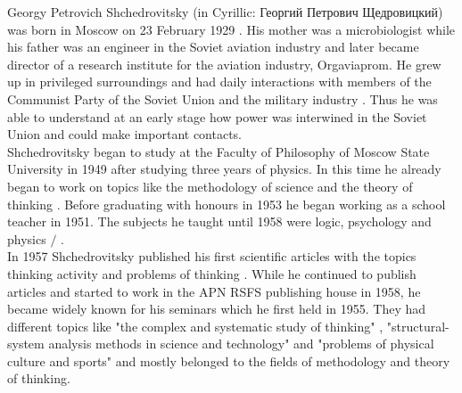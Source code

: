 \documentclass[11pt,a4paper]{article}
\begin{document}
Georgy Petrovich Shchedrovitsky (in Cyrillic: \foreignlanguage{russian}{Георгий Петрович Щедровицкий}) was born in Moscow on 23 February 1929 \cite[p. 1]{Davydova}. His mother was a microbiologist while his father was an engineer in the Soviet aviation industry and later became director of a research institute for the aviation industry, Orgaviaprom. He grew up in privileged surroundings and had daily interactions with members of the Communist Party of the Soviet Union and the military industry \cite[p. 7]{Rindzeviit2015}. Thus he was able to understand at an early stage how power was interwined in the Soviet Union and could make important contacts. \\
Shchedrovitsky began to study at the Faculty of Philosophy of Moscow State University in 1949 after studying three years of physics. In this time he already began to work on topics like the methodology of science and the theory of thinking \cite[p. 1]{Davydova}. Before graduating with honours in 1953 he began working as a school teacher in 1951. The subjects he taught until 1958 were logic, psychology and physics \cite[p. 1]{Davydova} $/$ \linebreak \cite[p. 7]{Rindzeviit2015}. \\
In 1957 Shchedrovitsky published his first scientific articles with the topics thinking activity and problems of thinking \cite[p. 1]{Davydova}. While he continued to publish articles and started to work in the APN RSFS publishing house in 1958, he became widely known for his seminars which he first held in 1955. They had different topics like "the complex and systematic study of thinking" \cite[p. 1]{Davydova}, "structural-system analysis methods in science and technology" \cite[p. 2]{Davydova} and "problems of physical culture and sports" \cite[p. 4]{Davydova} and mostly belonged to the fields of methodology and theory of thinking. \\
\end{document}
